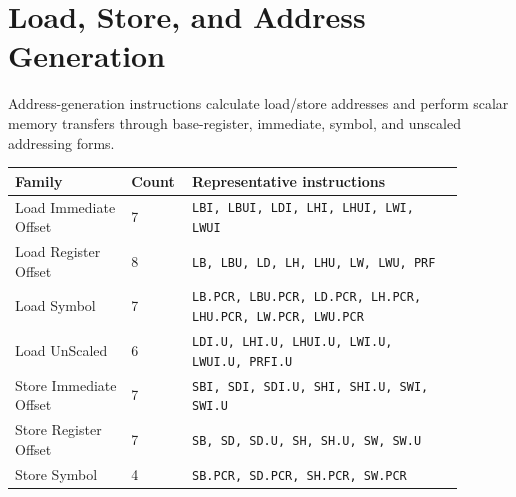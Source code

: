
\medskip

\medskip

\medskip

\medskip

\medskip

\medskip

\medskip

\medskip

\medskip

\medskip

\medskip

\medskip

\medskip

\medskip

\medskip

\medskip

\medskip

\medskip

\medskip

\medskip

\medskip

\medskip

\medskip

\medskip

\medskip

\medskip

\medskip

\medskip

\section{Load, Store, and Address Generation}
Address-generation instructions calculate load/store addresses and perform scalar memory transfers through base-register, immediate, symbol, and unscaled addressing forms.\par\smallskip
{\scriptsize
\begin{longtable}{@{}L{0.24\linewidth}R{0.09\linewidth}L{0.56\linewidth}@{}}
\toprule
Family & Count & Representative instructions \\
\midrule
Load Immediate Offset & 7 & \texttt{LBI, LBUI, LDI, LHI, LHUI, LWI, LWUI} \\
Load Register Offset & 8 & \texttt{LB, LBU, LD, LH, LHU, LW, LWU, PRF} \\
Load Symbol & 7 & \texttt{LB.PCR, LBU.PCR, LD.PCR, LH.PCR, LHU.PCR, LW.PCR, LWU.PCR} \\
Load UnScaled & 6 & \texttt{LDI.U, LHI.U, LHUI.U, LWI.U, LWUI.U, PRFI.U} \\
Store Immediate Offset & 7 & \texttt{SBI, SDI, SDI.U, SHI, SHI.U, SWI, SWI.U} \\
Store Register Offset & 7 & \texttt{SB, SD, SD.U, SH, SH.U, SW, SW.U} \\
Store Symbol & 4 & \texttt{SB.PCR, SD.PCR, SH.PCR, SW.PCR} \\
\bottomrule
\end{longtable}
}

